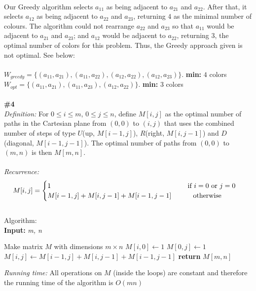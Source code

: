 \documentclass{article}
\newcommand\tab[1][1cm]{\hspace*{#1}}
\begin{document}
\\
Our Greedy algorithm selects $a_{11}$ as being adjacent to $a_{21}$ and $a_{22}$. After that, it selects $a_{12}$ as being adjacent to $a_{22}$ and $a_{23}$, returning $4$ as the minimal number of colours. The algorithm could not rearrange $a_{22}$ and $a_{23}$ so that $a_{11}$ would be adjacent to $a_{21}$ and $a_{23}$; and $a_{12}$ would be adjacent to $a_{22}$, returning $3$, the optimal number of colors for this problem. Thus, the Greedy approach given is not optimal. See below:\\
\\
$W_{greedy} = \{(a_{11}, a_{21}), (a_{11}, a_{22}), (a_{12}, a_{22}), (a_{12}, a_{23})\}$. \textbf{min:} $4$ colors\\
$W_{opt} = \{(a_{11}, a_{21}), (a_{11}, a_{23}), (a_{12}, a_{22})\}$. \textbf{min:} 3 colors\\
\\
\textbf{\#4}\\
\textit{Definition:} For $0 \leq i \leq m$, $0 \leq j \leq n$, define $M[i, j]$ as the optimal number of paths in the Cartesian plane from $(0, 0)$ to $(i, j)$ that uses the combined number of steps of type $U$(up, $M[i-1, j]$), $R$(right, $M[i, j-1]$) and $D$(diagonal, $M[i-1, j-1]$). The optimal number of paths from $(0,0)$ to $(m, n)$ is then $M[m, n]$.\\
\\
\textit{Recurrence:}
\begin{gather*}
M[i, j] =
\begin{cases}
1 \tab\tab\tab\tab\tab\tab\tab $if $i = 0$ or $j = 0 \\
M[i-1, j] + M[i, j-1] + M[i-1, j-1] \tab $ otherwise $
\end{cases}
\end{gather*}\\
Algorithm:\\
\textbf{Input:} \textit{m, n}
\begin{algorithmic}
\State Make matrix $M$ with dimensions $m \times n$
  \State $M[i, 0] \gets 1$
\EndFor
{}
  \State $M[0, j] \gets 1$
\EndFor
{}
    \State $M[i, j] \gets M[i-1, j] + M[i, j-1] + M[i-1, j-1]$
  \EndFor
\EndFor
\State \textbf{return} $M[m, n]$\\
\end{algorithmic}
\textit{Running time:} All operations on $M$ (inside the loops) are constant and therefore the running time of the algorithm is $O(mn)$\\\\
\end{document}
